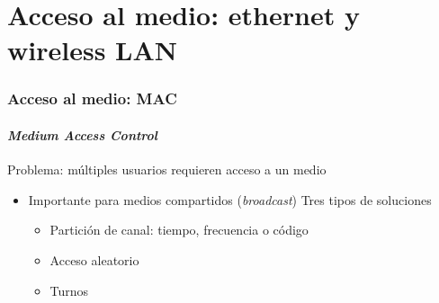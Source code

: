 \documentclass[letter]{beamer}
\begin{document}
\section{Acceso al medio: ethernet y wireless LAN}

\begin{frame}
  \frametitle{Acceso al medio: MAC}
  \framesubtitle{{\em Medium Access Control}}
  
  Problema: múltiples usuarios requieren acceso a un medio
  \begin{itemize}
    \item Importante para medios compartidos ({\em broadcast})
  Tres tipos de soluciones
  \begin{itemize}
    \item Partición de canal: tiempo, frecuencia o código
    \item Acceso aleatorio
    \item Turnos
  \end{itemize}
    
  \end{itemize}

\end{frame}
\end{document}
